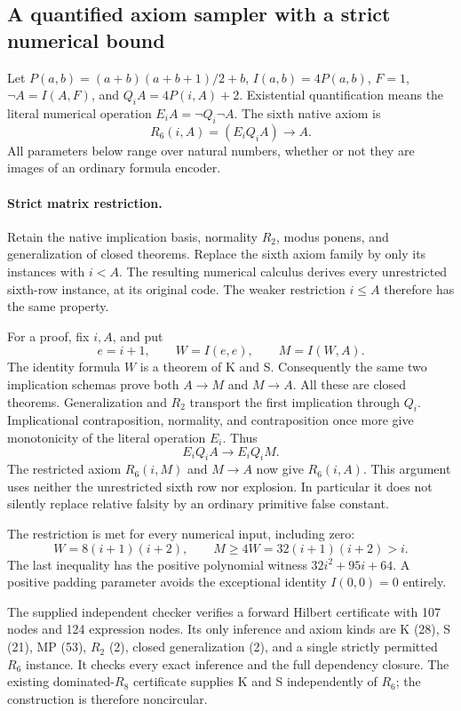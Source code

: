 \subsection{A quantified axiom sampler with a strict numerical bound}
\label{sec:quantifier-padding}
Let $P(a,b)=(a+b)(a+b+1)/2+b$, $I(a,b)=4P(a,b)$,
$F=1$, $\neg A=I(A,F)$, and
$Q_iA=4P(i,A)+2$.  Existential quantification means the literal numerical
operation $E_i A=\neg Q_i\neg A$.  The sixth native axiom is
\[
 R_6(i,A)=(E_iQ_i A)\to A.
\]
All parameters below range over natural numbers, whether or not they
are images of an ordinary formula encoder.

\paragraph{Strict matrix restriction.}
Retain the native implication basis, normality $R_2$, modus ponens,
and generalization of closed theorems. Replace the sixth axiom family
by only its instances with $i<A$. The resulting numerical calculus
derives every unrestricted sixth-row instance, at its original code.
The weaker restriction $i\leq A$ therefore has the same property.

For a proof, fix $i,A$, and put
\[
 e=i+1,\qquad W=I(e,e),\qquad M=I(W,A).
\]
The identity formula $W$ is a theorem of K and S. Consequently the
same two implication schemas prove both $A\to M$ and $M\to A$.
All these are closed theorems. Generalization and $R_2$ transport the
first implication through $Q_i$. Implicational contraposition,
normality, and contraposition once more give monotonicity of the
literal operation $E_i$. Thus
\[
 E_iQ_i A\longrightarrow E_iQ_i M.
\]
The restricted axiom $R_6(i,M)$ and $M\to A$ now give $R_6(i,A)$.
This argument uses neither the unrestricted sixth row nor explosion.
In particular it does not silently replace relative falsity by an
ordinary primitive false constant.

The restriction is met for every numerical input, including zero:
\[
 W=8(i+1)(i+2),\qquad
 M\geq4W=32(i+1)(i+2)>i.
\]
The last inequality has the positive polynomial witness
$32i^2+95i+64$. A positive padding parameter avoids the exceptional
identity $I(0,0)=0$ entirely.

The supplied independent checker verifies a forward Hilbert certificate
with 107 nodes and 124 expression nodes. Its only inference and axiom
kinds are K (28), S (21), MP (53), $R_2$ (2), closed generalization (2),
and a single strictly permitted $R_6$ instance. It checks every exact
inference and the full dependency closure. The existing dominated-$R_8$
certificate supplies K and S independently of $R_6$; the construction is
therefore noncircular.


